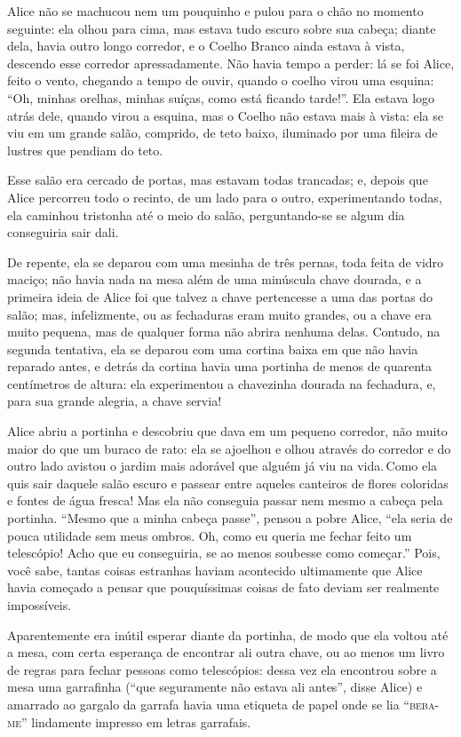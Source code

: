 Alice não se machucou nem um pouquinho e pulou para o chão no momento
seguinte: ela olhou para cima, mas estava tudo escuro sobre sua cabeça;
diante dela, havia outro longo corredor, e o Coelho Branco ainda estava
à vista, descendo esse corredor apressadamente. Não havia tempo a
perder: lá se foi Alice, feito o vento, chegando a tempo de ouvir,
quando o coelho virou uma esquina: ``Oh, minhas orelhas, minhas suíças,
como está ficando tarde!''. Ela estava logo atrás dele, quando virou a
esquina, mas o Coelho não estava mais à vista: ela se viu em um grande
salão, comprido, de teto baixo, iluminado por uma fileira de lustres que
pendiam do teto.

Esse salão era cercado de portas, mas estavam todas trancadas; e, depois
que Alice percorreu todo o recinto, de um lado para o outro,
experimentando todas, ela caminhou tristonha até o meio do salão,
perguntando-se se algum dia conseguiria sair dali.

De repente, ela se deparou com uma mesinha de três pernas, toda feita de
vidro maciço; não havia nada na mesa além de uma minúscula chave
dourada, e a primeira ideia de Alice foi que talvez a chave pertencesse
a uma das portas do salão; mas, infelizmente, ou as fechaduras eram
muito grandes, ou a chave era muito pequena, mas de qualquer forma não
abrira nenhuma delas. Contudo, na segunda tentativa, ela se deparou com
uma cortina baixa em que não havia reparado antes, e detrás da cortina
havia uma portinha de menos de quarenta centímetros de altura: ela
experimentou a chavezinha dourada na fechadura, e, para sua grande
alegria, a chave servia!

Alice abriu a portinha e descobriu que dava em um pequeno corredor, não
muito maior do que um buraco de rato: ela se ajoelhou e olhou através do
corredor e do outro lado avistou o jardim mais adorável que alguém já
viu na vida.\,Como ela quis sair daquele salão escuro e passear entre
aqueles canteiros de flores coloridas e fontes de água fresca! Mas ela
não conseguia passar nem mesmo a cabeça pela portinha. ``Mesmo que a
minha cabeça passe'', pensou a pobre Alice, ``ela seria de pouca
utilidade sem meus ombros. Oh, como eu queria me fechar feito um
telescópio! Acho que eu conseguiria, se ao menos soubesse como
começar.'' Pois, você sabe, tantas coisas estranhas haviam acontecido
ultimamente que Alice havia começado a pensar que pouquíssimas coisas
de fato deviam ser realmente impossíveis.

Aparentemente era inútil esperar diante da portinha, de modo que ela
voltou até a mesa, com certa esperança de encontrar ali outra chave, ou
ao menos um livro de regras para fechar pessoas como telescópios: dessa
vez ela encontrou sobre a mesa uma garrafinha (``que seguramente não
estava ali antes'', disse Alice) e amarrado ao gargalo da garrafa havia
uma etiqueta de papel onde se lia ``\textsc{beba-me}'' lindamente impresso em letras
garrafais.

